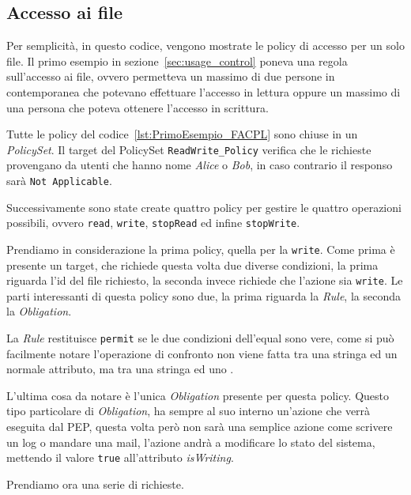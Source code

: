 \subsection{Accesso ai file} %
\label{ssub:primo_esempio}

Per semplicità, in questo codice, vengono mostrate le policy di accesso per un solo file.
Il primo esempio in sezione~\ref{sec:usage_control} poneva una regola sull'accesso ai file, ovvero permetteva un massimo di due persone in contemporanea che potevano effettuare l'accesso in lettura oppure un massimo di una persona che poteva ottenere l'accesso in scrittura.\\ \par
Tutte le policy del codice~\ref{lst:PrimoEsempio_FACPL} sono chiuse in un \textit{PolicySet}. Il target del PolicySet \texttt{ReadWrite\_Policy} verifica che le richieste provengano da utenti che hanno nome \textit{Alice} o \textit{Bob}, in caso contrario il responso sarà \texttt{Not Applicable}.\\ \par
Successivamente sono state create quattro policy per gestire le quattro operazioni possibili, ovvero \texttt{read}, \texttt{write}, \texttt{stopRead} ed infine \texttt{stopWrite}.\\ \par
Prendiamo in considerazione la prima policy, quella per la \texttt{write}. Come prima è presente un target, che richiede questa volta due diverse condizioni, la prima riguarda l'id del file richiesto, la seconda invece richiede che l'azione sia \texttt{write}. Le parti interessanti di questa policy sono due, la prima riguarda la \textit{Rule}, la seconda la \textit{Obligation}.\\ \par
La \textit{Rule} restituisce \texttt{permit} se le due condizioni dell'equal sono vere, come si può facilmente notare l'operazione di confronto non viene fatta tra una stringa ed un normale attributo, ma tra una stringa ed uno \statusattribute.\\ \par
L'ultima cosa da notare è l'unica \textit{Obligation} presente per questa policy. Questo tipo particolare di \textit{Obligation}, ha sempre al suo interno un'azione che verrà eseguita dal PEP, questa volta però non sarà una semplice azione come scrivere un log o mandare una mail, l'azione andrà a modificare lo stato del sistema, mettendo il valore \texttt{true} all'attributo \textit{isWriting}.\\ \par
Prendiamo ora una serie di richieste.


